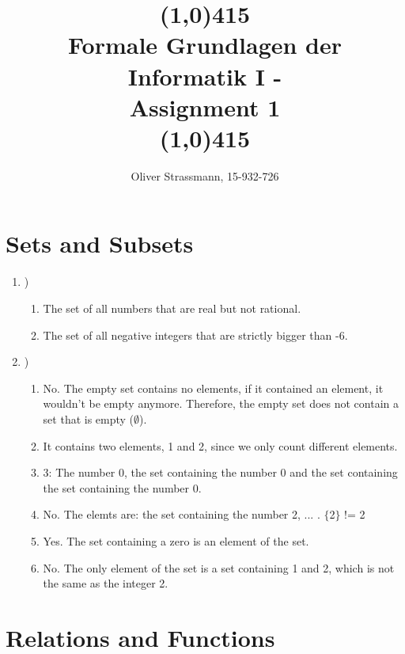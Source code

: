 \documentclass{article}
\title{ \line(1,0){415} \\ Formale Grundlagen der Informatik I -\\ Assignment 1 \theexercise\\
\line(1,0){415}}
\author{Oliver Strassmann, 15-932-726}
\begin{document}
\maketitle



\section{Sets and  Subsets}

\begin{enumerate}[label=\alph*]
	\item)
	\begin{enumerate}[label=\roman*]
		\item The set of all numbers that are real but not rational.
		\item The set of all negative integers that are strictly bigger than -6.\\ 
	\end{enumerate}

	\item)
	\begin{enumerate}[label=\roman*]
		\item No. The empty set contains no elements, if it contained an element, it wouldn't be empty anymore. Therefore, the empty set does not contain a set that is empty ($\emptyset$).
		\item It contains two elements, 1 and 2, since we only count different elements.
		\item 3: The number 0, the set containing the number 0 and the set containing the set containing the number 0. 
		\item No. The elemts are: the set containing the number 2, ... . $\lbrace$2$\rbrace$ != 2
		\item Yes. The set containing a zero is an element of the set.
		\item No. The only element of the set is a set containing 1 and 2, which is not the same as the integer 2.
	\end{enumerate}	
\end{enumerate}


\section{Relations and Functions}
\end{document}
